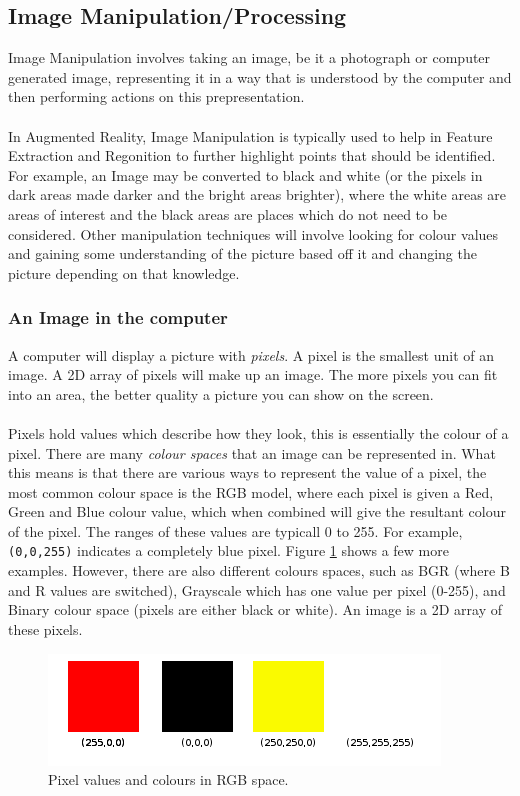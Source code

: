 \documentclass[11pt]{article}
\begin{document}
\subsection{Image Manipulation/Processing}
Image Manipulation involves taking an image, be it a photograph or 
computer generated image, representing it in a way that is understood
by the computer and then performing actions on this prepresentation.\\
\\
In Augmented Reality, Image Manipulation is typically used to help in
Feature Extraction and Regonition to further highlight points that should
be identified. For example, an Image may be converted to black and white
(or the pixels in dark areas made darker and the bright areas brighter),
where the white areas are areas of interest and the black areas are places
which do not need to be considered. Other manipulation techniques will
involve looking for colour values and gaining some understanding of
the picture based off it and changing the picture depending on that 
knowledge.

\subsubsection{An Image in the computer}
A computer will display a picture with \textit{pixels}. A pixel is the
smallest unit of an image. A 2D array of pixels will make up an image.
The more pixels you can fit into an area, the better quality a picture
you can show on the screen.\\
\\
Pixels hold values which describe how they look, this is
essentially the colour of a pixel. There are many \textit{colour spaces} that
an image can be represented in. What this means is that there are
various ways to represent the value of a pixel, the most common colour
space is the RGB model, where each pixel is given a Red, Green and Blue
colour value, which when combined will give the resultant colour of the
pixel. The ranges of these values are typicall 0 to 255. 
For example, \texttt{(0,0,255)} indicates a completely blue pixel. 
Figure \ref{fig:pixels} shows a few more examples. However, there are 
also different colours spaces, such as BGR (where B and R values are
switched), Grayscale which has one value per pixel (0-255), and Binary
colour space (pixels are either black or white).
An image is a 2D array of these pixels.

\begin{figure}
	\centering
	\includegraphics[scale=0.9]{pics/pixels.png}
	\caption{Pixel values and colours in RGB space.}
	\label{fig:pixels}
\end{figure}
\end{document}
